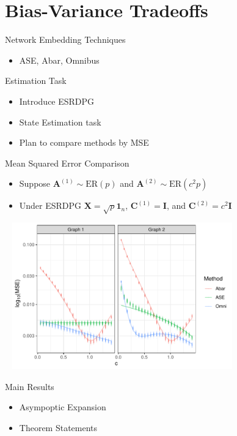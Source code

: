 \documentclass[handout]{beamer}
\newcommand{\bvar}[1]{\mathbf{#1}}
\begin{document}
\section{Bias-Variance Tradeoffs}

\begin{frame}{Network Embedding Techniques}
    \begin{itemize}
        \item ASE, Abar, Omnibus
    \end{itemize}
\end{frame}

\begin{frame}{Estimation Task}
    \begin{itemize}
        \item Introduce ESRDPG
        \item State Estimation task
        \item Plan to compare methods by MSE 
    \end{itemize}

\end{frame}

\begin{frame}{Mean Squared Error Comparison}
    \begin{itemize}
        \item Suppose $\bvar{A}^{(1)}\sim\text{ER}(p)$ and $\bvar{A}^{(2)}\sim\text{ER}(c^2p)$
        \item Under ESRDPG $\bvar{X} = \sqrt{p}\bvar{1}_n$,  $\bvar{C}^{(1)} = \bvar{I}$, and $\bvar{C}^{(2)} = c^2\bvar{I}$
    \end{itemize}\pause
\begin{center}
    \includegraphics[width = 4in, height = 2.5in]{1d_mse.pdf}
\end{center}
\end{frame}

\begin{frame}{Main Results}
    \begin{itemize}
        \item Asympoptic Expansion 
        \item Theorem Statements 
    \end{itemize}
\end{frame}
\end{document}
